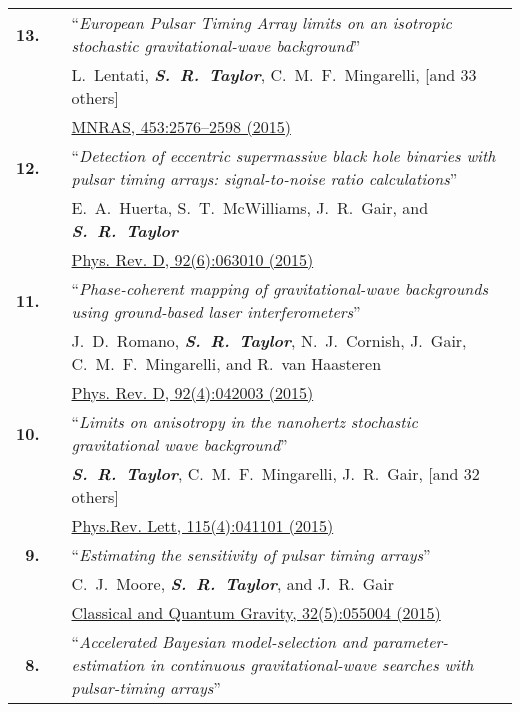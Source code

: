 \documentclass[11pt,letterpaper,sans]{moderncv}
\begin{document}
{\begin{longtable}{rp{0.3cm}p{15.8cm}}
\textbf{13.} & & ``\textit{European Pulsar Timing Array limits on an isotropic stochastic gravitational-wave background}'' \\ 
&& L.~Lentati, \textit{\textbf{S.~R.~Taylor}}, C.~M.~F.~Mingarelli, [and 33 others] \\ 
&& \href{http://mnras.oxfordjournals.org/content/453/3/2576}{{\color{color1} MNRAS, 453:2576--2598 (2015)}} \vspace{0.09cm}\\
\textbf{12.} & & ``\textit{Detection of eccentric supermassive black hole binaries with pulsar timing arrays: signal-to-noise ratio calculations}'' \\ 
&& E.~A.~Huerta, S.~T.~McWilliams, J.~R.~Gair, and \textit{\textbf{S.~R.~Taylor}} \\ 
&& \href{http://journals.aps.org/prd/abstract/10.1103/PhysRevD.92.063010}{{\color{color1} Phys. Rev. D, 92(6):063010 (2015)}} \vspace{0.09cm}\\
\textbf{11.} & & ``\textit{Phase-coherent mapping of gravitational-wave backgrounds using ground-based laser interferometers}'' \\ 
&& J.~D.~Romano, \textit{\textbf{S.~R.~Taylor}}, N.~J.~Cornish, J.~Gair, C.~M.~F.~Mingarelli, and R.~van Haasteren \\ 
&& \href{http://journals.aps.org/prd/abstract/10.1103/PhysRevD.92.042003}{{\color{color1} Phys. Rev. D, 92(4):042003 (2015)}} \vspace{0.09cm}\\
\textbf{10.} & & ``\textit{Limits on anisotropy in the nanohertz stochastic gravitational wave background}'' \\ 
&& \textit{\textbf{S.~R.~Taylor}}, C.~M.~F.~Mingarelli, J.~R.~Gair, [and 32 others] \\ 
&& \href{http://journals.aps.org/prl/abstract/10.1103/PhysRevLett.115.041101}{{\color{color1} Phys.Rev. Lett, 115(4):041101 (2015)}} \vspace{0.09cm}\\
\textbf{9.} & & ``\textit{Estimating the sensitivity of pulsar timing arrays}'' \\ 
&& C.~J.~Moore, \textit{\textbf{S.~R.~Taylor}}, and J.~R.~Gair \\ 
&& \href{http://iopscience.iop.org/article/10.1088/0264-9381/32/5/055004/meta}{{\color{color1} Classical and Quantum Gravity, 32(5):055004 (2015)}} \vspace{0.09cm}\\
\textbf{8.} & & ``\textit{Accelerated Bayesian model-selection and parameter-estimation in continuous gravitational-wave searches with pulsar-timing arrays}'' \\ 

\end{longtable}}
\end{document}

